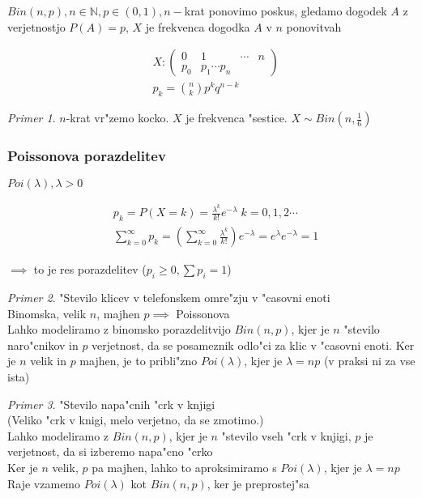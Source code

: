 \documentclass[a4paper,12pt]{article}
\theoremstyle{definition}
\theoremstyle{remark}
\newtheorem*{ex}{Primer}
\newcommand{\N}{\mathbb{N}}
\begin{document}
$Bin(n,p), n \in \N, p \in (0,1), n-$krat ponovimo poskus, gledamo dogodek $A$ z verjetnostjo $P(A) = p$, $X$ je
frekvenca dogodka $A$ v $n$ ponovitvah

\begin{align*}
    &X: \begin{pmatrix}
            0 & 1 & \cdots & n \\
            p_0 & p_1 \cdots p_n
        \end{pmatrix} \\
    &p_k = \binom{n}{k} p^k q^{n-k}
\end{align*}

\begin{ex}
    $n$-krat vr"zemo kocko. $X$ je frekvenca "sestice. $X \sim Bin(n, \frac{1}{6})$
\end{ex}





\subsubsection{Poissonova porazdelitev}

$Poi(\lambda), \lambda > 0$

\begin{align*}
    &p_k = P(X = k) = \frac{\lambda^k}{k!} e^{-\lambda} \; k = 0, 1, 2 \cdots \\
    &\sum_{k=0}^{\infty} p_k = (\sum_{k=0}^{\infty} \frac{\lambda^k}{k!}) e^{-\lambda} =
        e^{\lambda} e^{-\lambda} = 1
\end{align*}

$\implies$ to je res porazdelitev ($p_i \geq 0, \sum p_i = 1$)

\begin{ex}
    "Stevilo klicev v telefonskem omre"zju v "casovni enoti \\
    Binomska, velik $n$, majhen $p \implies$ Poissonova \\
    Lahko modeliramo z binomsko porazdelitvijo $Bin(n,p)$, kjer je $n$ "stevilo naro"cnikov in $p$ verjetnost, da se
    posameznik odlo"ci za klic v "casovni enoti. Ker je $n$ velik in $p$ majhen, je to pribli"zno $Poi(\lambda)$, kjer
    je $\lambda = np$ (v praksi ni za vse ista) 
\end{ex}

\begin{ex}
    "Stevilo napa"cnih "crk v knjigi \\
    (Veliko "crk v knigi, melo verjetno, da se zmotimo.) \\
    Lahko modeliramo z $Bin(n,p)$, kjer je $n$ "stevilo vseh "crk v knjigi, $p$ je verjetnost, da si izberemo
    napa"cno "crko \\
    Ker je $n$ velik, $p$ pa majhen, lahko to aproksimiramo s $Poi(\lambda)$, kjer je $\lambda = np$ \\
    Raje vzamemo $Poi(\lambda)$ kot $Bin(n,p)$, ker je preprostej"sa
\end{ex}
\end{document}
